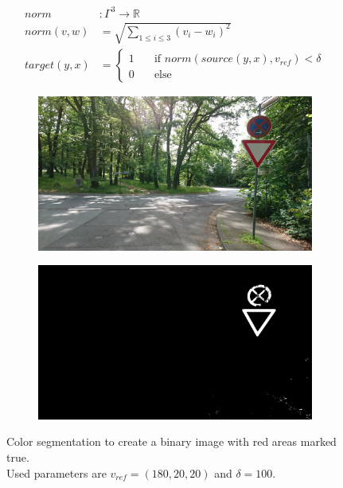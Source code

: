 \documentclass{report}
\begin{document}
\begin{equation}\label{eq:segmentation}
  \begin{split}
    norm & : \Gamma^3 \to \mathbb{R} \\
    norm(v, w) & = \sqrt{\sum_{1 \leq i \leq 3}(v_i - w_i)^2}  \\
    target(y, x) & =
    \begin{cases}
      1 & \quad \text{if } norm(source(y, x), v_{ref}) < \delta \\
      0 & \quad \text{else}
    \end{cases}
  \end{split}
\end{equation}

\begin{figure}
  \begin{subfigure}[t]{0.5\textwidth}
    \includegraphics[width=1\textwidth]{src/segmentation/original}
  \end{subfigure}
  \quad
  \begin{subfigure}[t]{0.5\textwidth}
    \includegraphics[width=1\textwidth]{src/segmentation/segmented}
  \end{subfigure}
  \caption{Color segmentation to create a binary image with red areas
    marked true. \\ Used parameters are \( v_{ref} = (180, 20, 20) \)
    and \( \delta = 100 \).}
\end{figure}
\end{document}
